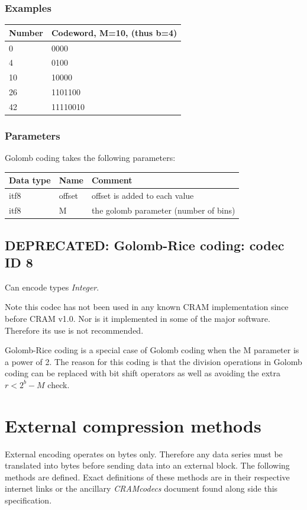 \documentclass[a4paper]{article}
\begin{document}
\subsubsection*{Examples}

\begin{tabular}{|>{\raggedright}p{76pt}|>{\raggedright}p{107pt}|}
\hline
\textbf{Number} & \textbf{Codeword, M=10, (thus b=4)}\tabularnewline
\hline
0 & 0000\tabularnewline
\hline
4 & 0100\tabularnewline
\hline
10 & 10000\tabularnewline
\hline
26 & 1101100\tabularnewline
\hline
42 & 11110010\tabularnewline
\hline
\end{tabular}

\subsubsection*{Parameters}

Golomb coding takes the following parameters: 

\begin{tabular}{|>{\raggedright}p{144pt}|>{\raggedright}p{144pt}|>{\raggedright}p{144pt}|}
\hline
\textbf{Data type} & \textbf{Name} & \textbf{Comment}\tabularnewline
\hline
itf8 & offset & offset is added to each value\tabularnewline
\hline
itf8 & M & the golomb parameter (number of bins)\tabularnewline
\hline
\end{tabular}

\subsection{DEPRECATED: Golomb-Rice coding: codec ID 8}

Can encode types \textit{Integer}.

Note this codec has not been used in any known CRAM implementation since before CRAM v1.0.
Nor is it implemented in some of the major software.
Therefore its use is not recommended.

Golomb-Rice coding is a special case of Golomb coding when the M parameter is a power of 2.
The reason for this coding is that the division operations in Golomb coding can be replaced with bit shift operators as well as avoiding the extra $r < 2^{b}-M$ check.

\section{\textbf{External compression methods}}

External encoding operates on bytes only. Therefore any data series must be translated into bytes before sending data into an external block.
The following methods are defined.
Exact definitions of these methods are in their respective internet links or the ancillary \textit{CRAMcodecs} document found along side this specification.
\end{document}
